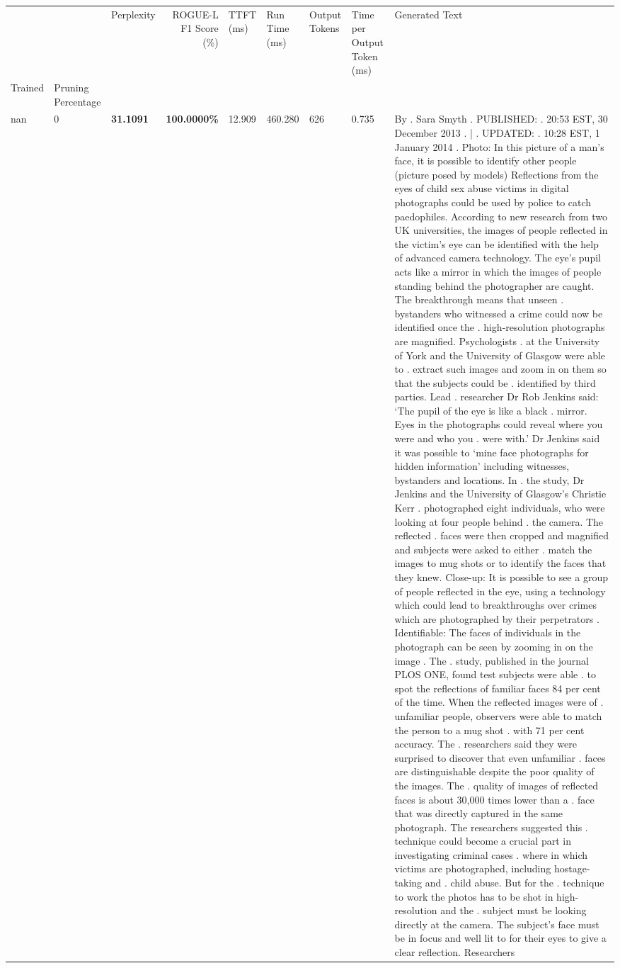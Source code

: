 \begin{table}[H]
\label{tab:evaluation-pipeline-5}
\begin{tabular}{lllrlllll}
\toprule
 &  & Perplexity & ROGUE-L F1 Score (\%) & TTFT (ms) & Run Time (ms) & Output Tokens & Time per Output Token (ms) & Generated Text \\
Trained & Pruning Percentage &  &  &  &  &  &  &  \\
\midrule
nan & 0 & \bfseries 31.1091 & \bfseries 100.0000\% & 12.909 & 460.280 & 626 & 0.735 & By . Sara Smyth . PUBLISHED: . 20:53 EST, 30 December 2013 . | . UPDATED: . 10:28 EST, 1 January 2014 . Photo: In this picture of a man's face, it is possible to identify other people (picture posed by models) Reflections from the eyes of child sex abuse victims in digital photographs could be used by police to catch paedophiles. According to new research from two UK universities, the images of people reflected in the victim's eye can be identified with the help of advanced camera technology. The eye's pupil acts like a mirror in which the images of people standing behind the photographer are caught. The breakthrough means that unseen . bystanders who witnessed a crime could now be identified once the . high-resolution photographs are magnified. Psychologists . at the University of York and the University of Glasgow were able to . extract such images and zoom in on them so that the subjects could be . identified by third parties. Lead . researcher Dr Rob Jenkins said: ‘The pupil of the eye is like a black . mirror. Eyes in the photographs could reveal where you were and who you . were with.' Dr Jenkins said it was possible to ‘mine face photographs for hidden information' including witnesses, bystanders and locations. In . the study, Dr Jenkins and the University of Glasgow's Christie Kerr . photographed eight individuals, who were looking at four people behind . the camera. The reflected . faces were then cropped and magnified and subjects were asked to either . match the images to mug shots or to identify the faces that they knew. Close-up: It is possible to see a group of people reflected in the eye, using a technology which could lead to breakthroughs over crimes which are photographed by their perpetrators . Identifiable: The faces of individuals in the photograph can be seen by zooming in on the image . The . study, published in the journal PLOS ONE, found test subjects were able . to spot the reflections of familiar faces 84 per cent of the time. When the reflected images were of . unfamiliar people, observers were able to match the person to a mug shot . with 71 per cent accuracy. The . researchers said they were surprised to discover that even unfamiliar . faces are distinguishable despite the poor quality of the images. The . quality of images of reflected faces is about 30,000 times lower than a . face that was directly captured in the same photograph. The researchers suggested this . technique could become a crucial part in investigating criminal cases . where in which victims are photographed, including hostage-taking and . child abuse. But for the . technique to work the photos has to be shot in high-resolution and the . subject must be looking directly at the camera. The subject's face must be in focus and well lit to for their eyes to give a clear reflection. Researchers 
\end{tabular}
\end{table}
